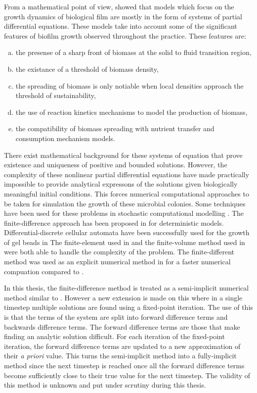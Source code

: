 From a mathematical point of view, \cite{efendiev2002existencelongtime} showed that models which focus on the growth dynamics of biological film are mostly in the form of systems of partial differential equations.
These models take into account some of the significant features of biofilm growth observed throughout the practice.
These features are:
\begin{enumerate}[a)]
  \item the presense of a sharp front of biomass at the solid to fluid transition region,
  \item the existance of a threshold of biomass density,
  \item the spreading of biomass is only notiable when local densities approach the threshold of sustainability,
  \item the use of reaction kinetics mechanisms to model the production of biomass,
  \item the compatibility of biomass spreading with nutrient transfer and consumption mechanism models.
\end{enumerate}
There exist mathematical background for these systems of equation that prove existence and uniqueness of positive and bounded solutions.
However, the complexity of these nonlinear partial differential equations have made practically impossible to provide analytical expressons of the solutions given biologically meaningful initial conditions.
This forces numerical computational approaches to be taken for simulation the growth of these microbial colonies.
Some techniques have been used for these problems in stochastic computational modelling \cite{mccollum2006sorting}.
The finite-difference approach has been proposed in \cite{eberl2001deterministic} for deterministic models.
Differential-discrete cellular automata have been successfully used for the growth of gel beads in \cite{picioreanu1998newCombined}
The finite-element used in \cite{duddu2008combined} and the finite-volume method used in \cite{gallo2003finiteVolume} were both able to handle the complexity of the problem.
The finite-different method was used as an explicit numerical method in \cite{macias-diaz2013efficientNonlinear} for a faster numerical compuation compared to \cite{eberl2001deterministic}.

In this thesis, the finite-difference method is treated as a semi-implicit numerical method similar to \cite{eberl2001deterministic}.
However a new extension is made on this where in a single timestep multiple solutions are found using a fixed-point iteration.
The use of this is that the terms of the system are split into forward difference terms and backwards difference terms.
The forward difference terms are those that make finding an analytic solution difficult.
For each iteration of the fixed-point iteration, the forward difference terms are updated to a new approximation of their \textit{a priori} value.
This turns the semi-implicit method into a fully-implicit method since the next timestep is reached once all the forward difference terms become sufficiently close to their true value for the next timestep.
The validity of this method is unknown and put under scrutiny during this thesis.

